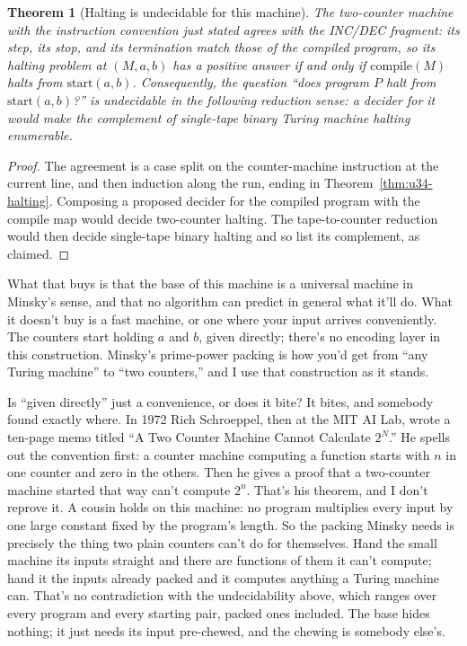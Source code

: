 \documentclass[11pt,twoside]{article}
\theoremstyle{thielethm}
\newtheorem{theorem}{Theorem}[section]
\theoremstyle{thieledef}
\theoremstyle{thieledef}
\theoremstyle{thieledef}
\theoremstyle{thielethm}
\theoremstyle{thieleobs}
\theoremstyle{thielethm}
\begin{document}
\begin{theorem}[Halting is undecidable for this machine]\label{thm:u34-undecidable}
The two-counter machine with the instruction convention just stated agrees with the
INC/DEC fragment: its step, its stop, and its termination match those of the compiled program,
so its halting problem at $(M, a, b)$ has a positive answer
if and only if $\mathrm{compile}(M)$ halts from $\mathrm{start}(a, b)$. Consequently, the
question ``does program $P$ halt from $\mathrm{start}(a, b)$?'' is undecidable in the
following reduction sense: a decider for it would make the complement of single-tape binary Turing machine
halting enumerable.
\end{theorem}

\begin{proof}
The agreement is a case split on the counter-machine instruction at the current line,
and then induction along the run, ending in Theorem~\ref{thm:u34-halting}. Composing a
proposed decider for the compiled program with the compile map would decide two-counter
halting. The tape-to-counter reduction would then
decide single-tape binary halting and so list its complement, as claimed.
\end{proof}

What that buys is that the base of this machine is a universal
machine in Minsky's sense, and that no algorithm can predict in general what
it'll do. What it doesn't buy is a fast machine, or one where your input arrives
conveniently. The counters start holding $a$ and $b$, given directly; there's no encoding
layer in this construction. Minsky's prime-power packing is how you'd get from ``any Turing machine''
to ``two counters,'' and I use that construction as it stands.

Is ``given directly'' just a convenience, or does it bite? It bites, and somebody found
exactly where. In 1972 Rich Schroeppel, then at the MIT AI Lab, wrote a ten-page memo titled
``A Two Counter Machine Cannot Calculate $2^N$.'' He spells out the convention first: a counter
machine computing a function starts with $n$ in one counter and zero in the others. Then he gives
a proof that a two-counter machine started that way can't compute
$2^n$. That's his theorem, and I don't reprove it. A cousin holds on this machine: no program multiplies every
input by one large constant fixed by the program's length. So the packing Minsky needs is precisely the thing two plain counters can't do for
themselves. Hand the small machine its inputs straight and there are functions of them it
can't compute; hand it the inputs already packed and it computes anything a Turing machine
can. That's no contradiction with the undecidability above, which ranges over every program
and every starting pair, packed ones included. The base hides nothing; it just needs its
input pre-chewed, and the chewing is somebody else's.
\end{document}
